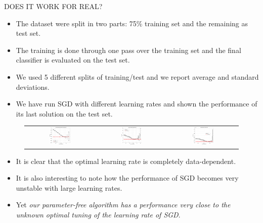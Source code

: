 \documentclass[final,t,serif,mathserif]{beamer}
\def\spazioo{\vspace{-0.3cm}}
\begin{document}
\begin{frame}{}
\begin{columns}[t]
\begin{column}{.33\linewidth}
    
    \begin{block}{DOES IT WORK FOR REAL?}
      \spazioo      
      \begin{itemize} 
        \item The dataset were split in two parts: 75\% training set and the remaining as test set.
        \item The training is done through one pass over the training set and the final classifier is evaluated on the test set.
        \item We used 5 different splits of training/test and we report average and standard deviations. 
        \item We have run SGD with different learning rates and shown the performance of its last solution on the test set.
       \end{itemize}
      \begin{figure}[t]
	\centering 
	\begin{tabular}{ccc}
	\includegraphics[width=0.32\textwidth]{../figs/yearPredictionMSD_kt_train_test-crop.pdf} &
        \includegraphics[width=0.32\textwidth]{../figs/cpusmall_kt_train_test-crop.pdf} &
        \includegraphics[width=0.32\textwidth]{../figs/cadata_kt_train_test-crop.pdf}
	\end{tabular}
      \end{figure}
      \begin{itemize} 
        \item It is clear that the optimal learning rate is completely data-dependent.
        \item It is also interesting to note how the performance of SGD becomes very unstable with large learning rates. \item Yet \emph{our parameter-free algorithm has a performance very close to the unknown optimal tuning of the learning rate of SGD}.
       \end{itemize}
      \spazioo
    \end{block}
    

\end{column}
\end{columns}
\end{frame}
\end{document}
